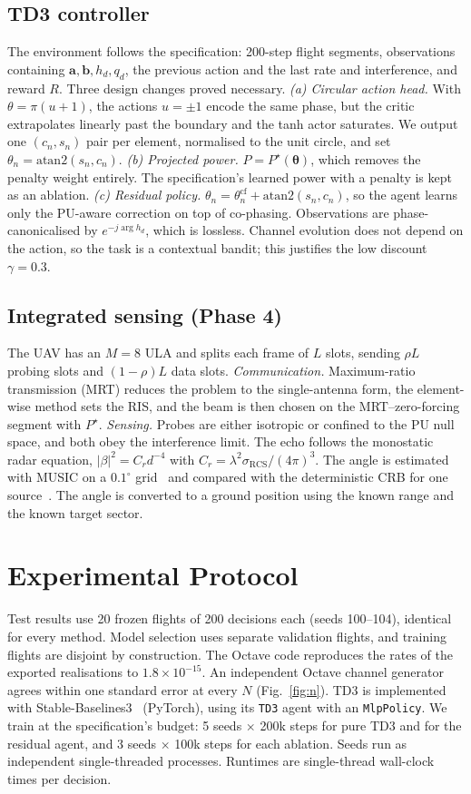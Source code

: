 \documentclass[conference]{IEEEtran}
\begin{document}
\subsection{TD3 controller}
The environment follows the specification: 200-step flight segments, observations containing $\mathbf{a},\mathbf{b},h_d,q_d$, the previous action and the last rate and interference, and reward $R$. Three design changes proved necessary.
\emph{(a) Circular action head.} With $\theta=\pi(u+1)$, the actions $u=\pm1$ encode the same phase, but the critic extrapolates linearly past the boundary and the tanh actor saturates. We output one $(c_n,s_n)$ pair per element, normalised to the unit circle, and set $\theta_n=\mathrm{atan2}(s_n,c_n)$.
\emph{(b) Projected power.} $P=P^\star(\bm\theta)$, which removes the penalty weight entirely. The specification's learned power with a penalty is kept as an ablation.
\emph{(c) Residual policy.} $\theta_n=\theta^{\mathrm{cf}}_n+\mathrm{atan2}(s_n,c_n)$, so the agent learns only the PU-aware correction on top of co-phasing.
Observations are phase-canonicalised by $e^{-j\arg h_d}$, which is lossless. Channel evolution does not depend on the action, so the task is a contextual bandit; this justifies the low discount $\gamma=0.3$.

\subsection{Integrated sensing (Phase 4)}
The UAV has an $M=8$ ULA and splits each frame of $L$ slots, sending $\rho L$ probing slots and $(1-\rho)L$ data slots.
\emph{Communication.} Maximum-ratio transmission (MRT) reduces the problem to the single-antenna form, the element-wise method sets the RIS, and the beam is then chosen on the MRT--zero-forcing segment with $P^\star$.
\emph{Sensing.} Probes are either isotropic or confined to the PU null space, and both obey the interference limit. The echo follows the monostatic radar equation, $|\beta|^2=C_r d^{-4}$ with $C_r=\lambda^2\sigma_{\mathrm{RCS}}/(4\pi)^3$. The angle is estimated with MUSIC on a $0.1^\circ$ grid~\cite{schmidt1986} and compared with the deterministic CRB for one source~\cite{stoica1989}. The angle is converted to a ground position using the known range and the known target sector.

\section{Experimental Protocol}
Test results use 20 frozen flights of 200 decisions each (seeds 100--104), identical for every method. Model selection uses separate validation flights, and training flights are disjoint by construction. The Octave code reproduces the rates of the exported realisations to $1.8\times10^{-15}$. An independent Octave channel generator agrees within one standard error at every $N$ (Fig.~\ref{fig:n}). TD3 is implemented with Stable-Baselines3~\cite{raffin2021} (PyTorch), using its \texttt{TD3} agent with an \texttt{MlpPolicy}. We train at the specification's budget: 5 seeds $\times$ 200k steps for pure TD3 and for the residual agent, and 3 seeds $\times$ 100k steps for each ablation. Seeds run as independent single-threaded processes. Runtimes are single-thread wall-clock times per decision.
\end{document}
